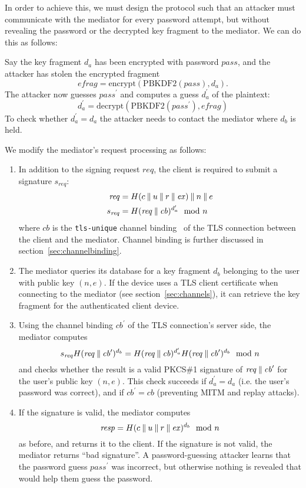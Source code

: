 In order to achieve this, we must design the protocol such that an attacker must communicate with
the mediator for every password attempt, but without revealing the password or the decrypted key
fragment to the mediator. We can do this as follows:

Say the key fragment $d_a$ has been encrypted with password $\mathit{pass}$, and the attacker has
stolen the encrypted fragment
$$\mathit{efrag} = \mathrm{encrypt}(\mathrm{PBKDF2}(\mathit{pass}), d_a).$$
The attacker now guesses $\mathit{pass}^\prime$ and computes a guess $d_a^\prime$ of the plaintext:
$$d_a^\prime = \mathrm{decrypt}(\mathrm{PBKDF2}(\mathit{pass}^\prime), \mathit{efrag})$$
To check whether $d_a^\prime = d_a$ the attacker needs to contact the mediator where $d_b$ is held.

We modify the mediator's request processing as follows:
\begin{enumerate}
\item In addition to the signing request $\mathit{req}$, the client is required to submit a
signature $s_\mathit{req}$:
\begin{align*}
    \mathit{req} &= H(c \mathbin{\|} u \mathbin{\|} r \mathbin{\|} \mathit{ex}) \mathbin{\|} n \mathbin{\|} e \\
    s_\mathit{req} &= H(\mathit{req} \mathbin{\|} \mathit{cb})^{d_a^\prime} \mod n
\end{align*}
where $\mathit{cb}$ is the \texttt{tls-unique} channel binding~\cite{ChannelBinding}
of the TLS connection between the client and the mediator. Channel binding is further discussed in
section~\ref{sec:channelbinding}.
\item The mediator queries its database for a key fragment $d_b$ belonging to the user with public
key $(n, e)$. If the device uses a TLS client certificate when connecting to the mediator (see
section~\ref{sec:channels}), it can retrieve the key fragment for the authenticated client device.
\item Using the channel binding $\mathit{cb}^\prime$ of the TLS connection's server side, the
mediator computes
$$s_\mathit{req} H(\mathit{req} \mathbin{\|} \mathit{cb}^\prime)^{d_b} =
  H(\mathit{req} \mathbin{\|} \mathit{cb})^{d_a^\prime} H(\mathit{req} \mathbin{\|} \mathit{cb}^\prime)^{d_b} \mod n$$
and checks whether the result is a valid PKCS\#1 signature of
$\mathit{req} \mathbin{\|} \mathit{cb}^\prime$ for the user's public key $(n, e)$. This check succeeds if
$d_a^\prime = d_a$ (i.e. the user's password was correct), and if $\mathit{cb}^\prime = \mathit{cb}$
(preventing MITM and replay attacks).
\item If the signature is valid, the mediator computes
$$\mathit{resp} = H(c \mathbin{\|} u \mathbin{\|} r \mathbin{\|} \mathit{ex})^{d_b} \mod n$$
as before, and returns it to the client. If the signature is not valid, the mediator returns ``bad
signature''. A password-guessing attacker learns that the password guess $\mathit{pass}^\prime$ was
incorrect, but otherwise nothing is revealed that would help them guess the password.
\end{enumerate}

